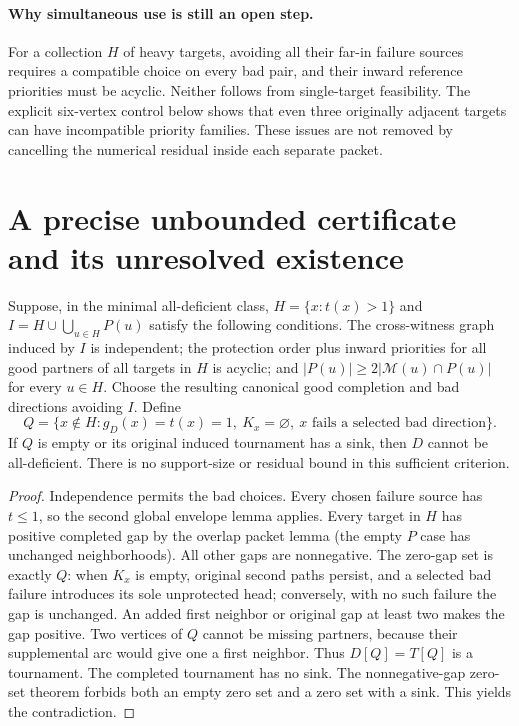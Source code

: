 \paragraph{Why simultaneous use is still an open step.}
For a collection $H$ of heavy targets, avoiding all their far-in failure
sources requires a compatible choice on every bad pair, and their
inward reference priorities must be acyclic. Neither follows from
single-target feasibility. The explicit six-vertex control below shows
that even three originally adjacent targets can have incompatible
priority families. These issues are not removed by cancelling the
numerical residual inside each separate packet.

\section{A precise unbounded certificate and its unresolved existence}
\label{sec:global-heavy-cover-certificate}

\begin{theorem}
\label{thm:global-heavy-cover-certificate}
Suppose, in the minimal all-deficient class, $H=\{x:t(x)>1\}$ and
$I=H\cup\bigcup_{u\in H}P(u)$ satisfy the following conditions.
The cross-witness graph induced by $I$ is independent; the protection
order plus inward priorities for all good partners of all targets in
$H$ is acyclic; and $|P(u)|\ge2|\mathcal M(u)\cap P(u)|$ for every
$u\in H$. Choose the resulting canonical good completion and bad
directions avoiding $I$. Define
\[
 Q=\{x\notin H:g_D(x)=t(x)=1,\ K_x=\varnothing,
              \ x\text{ fails a selected bad direction}\}.
\]
If $Q$ is empty or its original induced tournament has a sink, then
$D$ cannot be all-deficient. There is no support-size or residual bound
in this sufficient criterion.
\end{theorem}
\begin{proof}
Independence permits the bad choices. Every chosen failure source has
$t\le1$, so the second global envelope lemma applies. Every target in
$H$ has positive completed gap by the overlap packet lemma (the empty
$P$ case has unchanged neighborhoods). All other gaps are nonnegative.
The zero-gap set is exactly $Q$: when $K_x$ is empty, original second
paths persist, and a selected bad failure introduces its sole unprotected
head; conversely, with no such failure the gap is unchanged. An added
first neighbor or original gap at least two makes the gap positive.
Two vertices of $Q$ cannot be missing partners, because their supplemental
arc would give one a first neighbor. Thus $D[Q]=T[Q]$ is a tournament.
The completed tournament has no sink. The nonnegative-gap
zero-set theorem forbids both an empty zero set and a zero set with a
sink. This yields the contradiction.
\end{proof}

